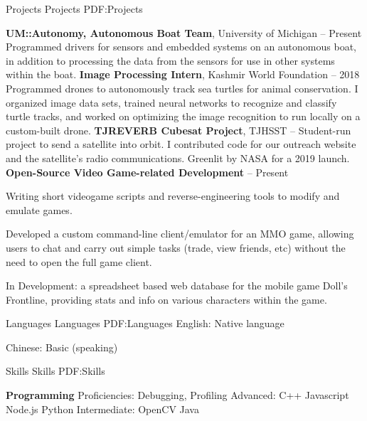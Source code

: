 \documentclass[letterpaper,MMMyyyy,nonstopmode]{style}
\begin{document}
\begin{Body}
\Section
{Projects}
{Projects}
{PDF:Projects}

\Entry
{\textbf{UM::Autonomy, Autonomous Boat Team}}, University of Michigan
\hfill
{} -- Present
\Gap
Programmed drivers for sensors and embedded systems on an autonomous boat, in addition to processing the data from the sensors for use in other systems within the boat.
\Gap
\Entry
{\textbf{Image Processing Intern}}, Kashmir World Foundation
\hfill
{} -- {2018}
\Gap
Programmed drones to autonomously track sea turtles for animal conservation. I organized image data sets, trained neural networks to recognize and classify turtle tracks, and worked on optimizing the image recognition to run locally on a custom-built drone.
\Gap
\Entry
{\textbf{TJREVERB Cubesat Project}}, TJHSST
\hfill
{} -- 
\Gap
Student-run project to send a satellite into orbit. I contributed code for our outreach website and the satellite's radio communications. Greenlit by NASA for a 2019 launch.
\Gap
\Entry
{\textbf{Open-Source Video Game-related Development}}
\hfill
{} -- Present
\Gap

Writing short videogame scripts and reverse-engineering tools to modify and emulate games.

Developed a custom command-line client/emulator for an MMO game, allowing users to chat and carry out simple tasks (trade, view friends, etc) without the need to open the full game client. %

In Development: a spreadsheet based web database for the mobile game Doll's Frontline, providing stats and info on various characters within the game.


\Section
{Languages}
{Languages}
{PDF:Languages}
English: Native language

Chinese: Basic (speaking)


\Section
{Skills}
{Skills}
{PDF:Skills}

\Entry
{\textbf{Programming}}
\Gap
Proficiencies: Debugging, Profiling
\Gap
Advanced:
C++ \SubBulletSymbol \space 
Javascript \SubBulletSymbol \space 
Node.js \SubBulletSymbol \space
Python
\Gap
Intermediate:
OpenCV \SubBulletSymbol \space
Java


\end{Body}
\end{document}
